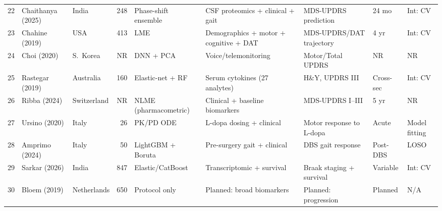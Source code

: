 \documentclass[11pt,a4paper]{article}
\begin{document}
\begin{landscape}
\begin{small}
\begin{longtable}{@{}clp{1.8cm}rp{2.2cm}p{2.5cm}p{2.8cm}p{1.5cm}p{1.8cm}@{}}
22 & Chaithanya (2025) & India   & 248   & Phase-shift ensemble & CSF proteomics + clinical + gait & MDS-UPDRS prediction & 24 mo & Int: CV \\
23 & Chahine (2019)    & USA     & 413   & LME & Demographics + motor + cognitive + DAT & MDS-UPDRS/DAT trajectory & 4 yr & Int: CV \\
24 & Choi (2020)       & S.\ Korea & NR  & DNN + PCA & Voice/telemonitoring & Motor/Total UPDRS & NR & NR \\
25 & Rastegar (2019)   & Australia & 160  & Elastic-net + RF & Serum cytokines (27 analytes) & H\&Y, UPDRS III & Cross-sec & Int: CV \\
26 & Ribba (2024)      & Switzerland & NR & NLME (pharmacometric) & Clinical + baseline biomarkers & MDS-UPDRS I--III & 5 yr & NR \\
27 & Ursino (2020)     & Italy   & 26    & PK/PD ODE & L-dopa dosing + clinical & Motor response to L-dopa & Acute & Model fitting \\
28 & Amprimo (2024)    & Italy   & 50    & LightGBM + Boruta & Pre-surgery gait + clinical & DBS gait response & Post-DBS & LOSO \\
29 & Sarkar (2026)     & India   & 847   & Elastic/CatBoost & Transcriptomic + survival & Braak staging + survival & Variable & Int: CV \\
30 & Bloem (2019)      & Netherlands & 650 & Protocol only & Planned: broad biomarkers & Planned: progression & Planned & N/A \\
\end{longtable}
\end{small}
\end{landscape}
\end{document}
